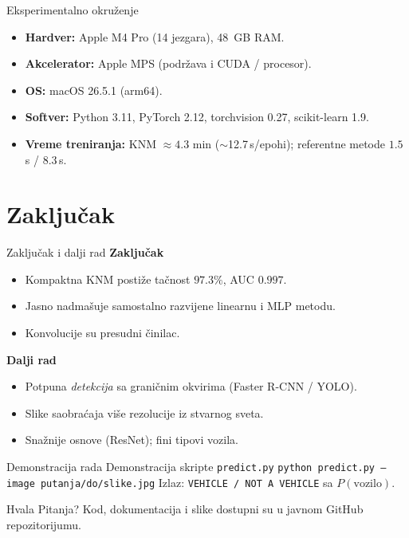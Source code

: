 \documentclass[aspectratio=169]{beamer}
\begin{document}
\begin{frame}{Eksperimentalno okru\v zenje}
  \begin{itemize}
    \item \textbf{Hardver:} Apple M4 Pro (14 jezgara), 48~GB RAM.
    \item \textbf{Akcelerator:} Apple MPS (podr\v zava i CUDA / procesor).
    \item \textbf{OS:} macOS 26.5.1 (arm64).
    \item \textbf{Softver:} Python 3.11, PyTorch 2.12, torchvision 0.27,
          scikit-learn 1.9.
    \item \textbf{Vreme treniranja:} KNM $\approx 4.3$ min ($\sim$12.7\,s/epohi);
          referentne metode $1.5$\,s / $8.3$\,s.
  \end{itemize}
\end{frame}

\section{Zaklju\v cak}
\begin{frame}{Zaklju\v cak i dalji rad}
  \textbf{Zaklju\v cak}
  \begin{itemize}
    \item Kompaktna KNM posti\v ze ta\v cnost $97.3\%$, AUC $0.997$.
    \item Jasno nadma\v suje samostalno razvijene linearnu i MLP metodu.
    \item Konvolucije su presudni \v cinilac.
  \end{itemize}
  \textbf{Dalji rad}
  \begin{itemize}
    \item Potpuna \emph{detekcija} sa grani\v cnim okvirima (Faster R-CNN / YOLO).
    \item Slike saobra\'caja vi\v se rezolucije iz stvarnog sveta.
    \item Sna\v znije osnove (ResNet); fini tipovi vozila.
  \end{itemize}
\end{frame}

\begin{frame}{Demonstracija rada}
  \centering
  \Large Demonstracija skripte \texttt{predict.py}
  \vfill
  \normalsize
  \texttt{python predict.py --image putanja/do/slike.jpg}
  \vfill
  \footnotesize Izlaz: \texttt{VEHICLE / NOT A VEHICLE} sa
  $P(\text{vozilo})$.
\end{frame}

\begin{frame}{Hvala}
  \centering
  \Large Pitanja?
  \vfill
  \normalsize Kod, dokumentacija i slike dostupni su u javnom GitHub
  repozitorijumu.
\end{frame}
\end{document}
